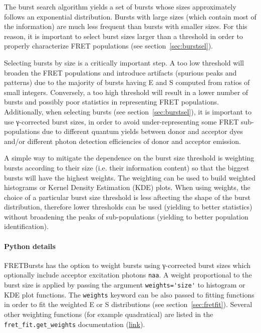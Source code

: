 The burst search algorithm yields a set of bursts whose sizes
approximately follows an exponential distribution.
Bursts with large sizes (which contain most of the information)
are much less frequent than bursts with smaller sizes. For this reason, it is 
important to select burst sizes larger than a threshold in order
to properly characterize FRET populations (see section~\ref{sec:burstsel}). 

Selecting bursts by size is a critically important step.
A too low threshold will broaden the FRET populations and introduce
artifacts (spurious peaks and patterns) due to the majority of bursts
having E and S computed from ratios of small integers. 
Conversely, a too high threshold will result in a lower number of bursts 
and possibly poor statistics in representing FRET populations.
Additionally, when selecting bursts (see section~\ref{sec:burstsel}), 
it is important to use γ-corrected burst sizes,
in order to avoid under-representing some FRET sub-populations
due to different quantum yields between donor and acceptor dyes and/or 
different photon detection efficiencies of donor and acceptor emission.

A simple way to mitigate the dependence on the burst size threshold is
weighting bursts according to their size (i.e. their information content)
so that the biggest bursts will have the highest weights.
The weighting can be used to build weighted histograms or Kernel Density 
Estimation (KDE) plots. When using weights, the choice of a particular 
burst size threshold is less aftecting the shape of the burst distribution,
therefore lower thresholds can be used (yielding to better statistics) 
without broadening the peaks of sub-populations (yielding to better 
population identification).

\paragraph{Python details}
FRETBursts has the option to weight bursts using γ-corrected 
burst sizes which optionally include acceptor excitation photons \verb|naa|.
A weight proportional to the burst size is applied by passing the argument 
\verb|weights='size'| to histogram or KDE plot functions. The \verb|weights|
keyword can be also passed to fitting functions in order to fit 
the weighted E or S distributions (see section~\ref{sec:fretfit}).
Several other weighting functions (for example quadratical) are listed in the
\verb|fret_fit.get_weights| documentation
(\href{http://fretbursts.readthedocs.org/en/latest/fret_fit.html#fretbursts.fret_fit.get_weights}{link}).

